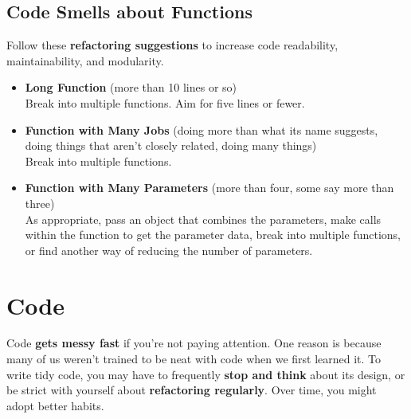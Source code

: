 \subsection{Code Smells about Functions}

Follow these \textbf{refactoring suggestions} to increase code readability, maintainability, and modularity.\\

\begin{itemize}

\item{\textbf{Long Function} (more than 10 lines or so)\\Break into multiple functions. Aim for five lines or fewer.\\}

\item{\textbf{Function with Many Jobs} (doing more than what its name suggests, doing things that aren't closely related, doing many things)\\
Break into multiple functions.
\spacer} 
\item{\textbf{Function with Many Parameters} (more than four, some say more than three)\\
As appropriate, pass an object that combines the parameters, make calls within the function to get the parameter data, break into multiple functions, or find another way of reducing the number of parameters.
\spacer}

\end{itemize}

\section{Code}

Code \textbf{gets messy fast} if you're not paying attention. One reason is because many of us weren't trained to be neat with code when we first learned it. To write tidy code, you may have to frequently \textbf{stop and think} about its design, or be strict with yourself about \textbf{refactoring regularly}. Over time, you might adopt better habits.

